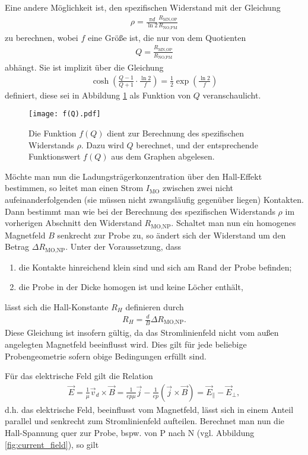 Eine andere Möglichkeit ist, den spezifischen Widerstand mit der Gleichung 
\begin{align}
\rho=\frac{\pi d}{\ln 2}\frac{R_\text{MN,OP}}{R_\text{NO,PM}}
\end{align}
zu berechnen, wobei $f$ eine Größe ist, die nur von dem Quotienten
\begin{align}
Q=\frac{R_\text{MN,OP}}{R_\text{NO,PM}}
\end{align}
abhängt. Sie ist implizit über die Gleichung
\begin{align}
\cosh\left(\frac{Q-1}{Q+1}\cdot\frac{\ln 2}{f}\right)=\frac{1}{2}\exp\left(\frac{\ln 2}{f}\right)
\end{align}
definiert, diese sei in Abbildung \ref{fig:f(Q)} als Funktion von $Q$ veranschaulicht.
\begin{figure}[h]
\centering
\texttt{[image: f(Q).pdf]}
\caption{Die Funktion $f(Q)$ dient zur Berechnung des spezifischen Widerstands $\rho$. Dazu wird $Q$ berechnet, und der entsprechende Funktionswert $f(Q)$ aus dem Graphen abgelesen.}
\label{fig:f(Q)}
\end{figure}

\newpage
Möchte man nun die Ladungsträgerkonzentration über den Hall-Effekt bestimmen, so leitet man einen Strom $I_\text{MO}$ zwischen zwei nicht aufeinanderfolgenden (sie müssen nicht zwangsläufig gegenüber liegen) Kontakten. Dann bestimmt man wie bei der Berechnung des spezifischen Widerstands $\rho$ im vorherigen Abschnitt den Widerstand $R_\text{MO,NP}$. Schaltet man nun ein homogenes Magnetfeld $B$ senkrecht zur Probe zu, so ändert sich der Widerstand um den Betrag $\Delta R_\text{MO,NP}$.
Unter der Voraussetzung, dass
\begin{enumerate}
\item die Kontakte hinreichend klein sind und sich am Rand der Probe befinden;
\item die Probe in der Dicke homogen ist und keine Löcher enthält,
\end{enumerate}
lässt sich die Hall-Konstante $R_H$ definieren durch
\begin{align}
R_H=\frac{d}{B}\Delta R_\text{MO,NP}.
\end{align}
Diese Gleichung ist insofern gültig, da das Stromlinienfeld nicht vom außen angelegten Magnetfeld beeinflusst wird. Dies gilt für jede beliebige Probengeometrie sofern obige Bedingungen erfüllt sind.

Für das elektrische Feld gilt die Relation
\begin{align}
\vec{E}=\frac{1}{\mu}\vec{v}_d\times \vec{B}=\frac{1}{ep\mu}\vec{j}-\frac{1}{ep}(\vec{j}\times \vec{B})=\vec{E}_{\parallel}-\vec{E}_{\perp},
\end{align}
d.h. das elektrische Feld, beeinflusst vom Magnetfeld, lässt sich in einem Anteil parallel und senkrecht zum Stromlinienfeld aufteilen. Berechnet man nun die Hall-Spannung quer zur Probe, bspw. von P nach N (vgl. Abbildung \ref{fig:current_field}), so gilt

